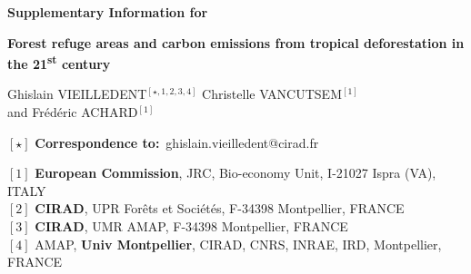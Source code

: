 
\begin{center}
  \Large{\textbf{Supplementary Information for}}
\end{center}

\vspace{1cm}

\begin{center}
  \LARGE{\textbf{\textcolor{pinpblue}{Forest refuge areas and carbon emissions from tropical deforestation in the 21\textsuperscript{st} century}}}
\end{center}

\vspace{1cm}

\begin{center}
  \large{
  Ghislain VIEILLEDENT$^{[\star, 1, 2, 3, 4]}$ \hspace{0.5cm} Christelle VANCUTSEM$^{[1]}$\\
  \vspace{0.5cm}
  and \hspace{0.5cm} Frédéric ACHARD$^{[1]}$
  }
\end{center}

\vspace{0.5cm}

\begin{center}
  $[\star]$ \textbf{Correspondence to:}~ghislain.vieilledent@cirad.fr\\
\end{center}

\vspace{0.5cm}

{\small
  \begin{flushleft}
    $[1]$ \textbf{European Commission}, JRC, Bio-economy Unit, I-21027 Ispra (VA), ITALY\\
    $[2]$ \textbf{CIRAD}, UPR Forêts et Sociétés, F-34398 Montpellier, FRANCE\\
    $[3]$ \textbf{CIRAD}, UMR AMAP, F-34398 Montpellier, FRANCE\\
    $[4]$ AMAP, \textbf{Univ Montpellier}, CIRAD, CNRS, INRAE, IRD, Montpellier, FRANCE\\
  \end{flushleft}}

\vspace{1cm}

